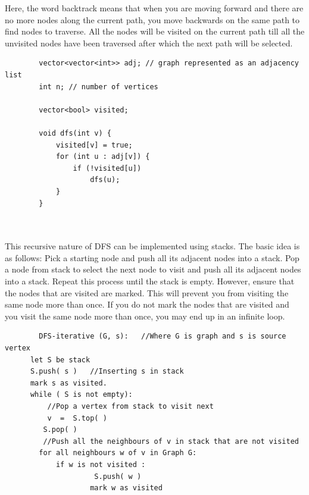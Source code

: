 \documentclass[12pt]{article}
\begin{document}
        Here, the word backtrack means that when you are moving forward and there are no more nodes along the current path, you move backwards on the same path to find nodes to traverse. All the nodes will be visited on the current path till all the unvisited nodes have been traversed after which the next path will be selected. \cite{18}
        
        \begin{verbatim}
        vector<vector<int>> adj; // graph represented as an adjacency list
        int n; // number of vertices
        
        vector<bool> visited;
        
        void dfs(int v) {
            visited[v] = true;
            for (int u : adj[v]) {
                if (!visited[u])
                    dfs(u);
            }
        }
        
        
    \end{verbatim}
    This recursive nature of DFS can be implemented using stacks. The basic idea is as follows:
    Pick a starting node and push all its adjacent nodes into a stack.
    Pop a node from stack to select the next node to visit and push all its adjacent nodes into a stack.
    Repeat this process until the stack is empty. However, ensure that the nodes that are visited are marked. This will prevent you from visiting the same node more than once. If you do not mark the nodes that are visited and you visit the same node more than once, you may end up in an infinite loop. \cite{18}
    
   \begin{verbatim}
        DFS-iterative (G, s):   //Where G is graph and s is source vertex
      let S be stack
      S.push( s )   //Inserting s in stack 
      mark s as visited.
      while ( S is not empty):
          //Pop a vertex from stack to visit next
          v  =  S.top( )
         S.pop( )
         //Push all the neighbours of v in stack that are not visited   
        for all neighbours w of v in Graph G:
            if w is not visited :
                     S.push( w )         
                    mark w as visited
    \end{verbatim}
\end{document}
